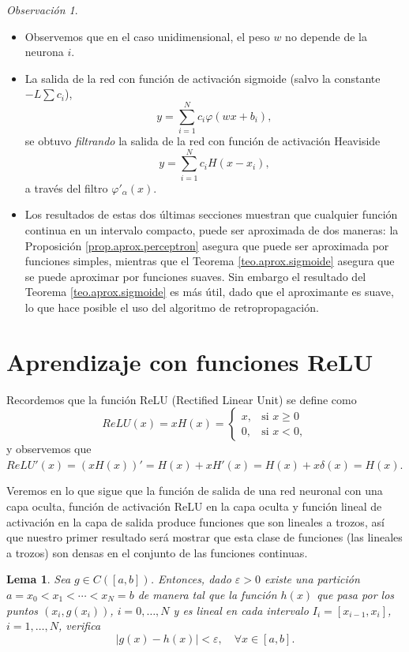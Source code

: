 \documentclass[12pt, a4paper]{amsbook}
\newcommand{\ve}{\varepsilon}
\newtheorem{lema}[teo]{Lema}
\theoremstyle{remark}
\newtheorem{obs}[teo]{Observaci\'on}
\theoremstyle{definition}
\numberwithin{section}{chapter}
\numberwithin{subsection}{section}
\numberwithin{equation}{section}
\numberwithin{figure}{chapter}
\begin{document}
\begin{obs}
\begin{itemize}
\item[(i)] Observemos que en el caso unidimensional, el peso $w$ no depende de la neurona $i$.
\item[(ii)] La salida de la red con función de activación sigmoide (salvo la constante $-L\sum c_i$),
$$
y = \sum_{i=1}^N c_i\varphi(w x + b_i),
$$
se obtuvo {\em filtrando} la salida de la red con función de activación Heaviside
$$
y = \sum_{i=1}^N c_i H(x - x_i),
$$
a través del filtro $\varphi'_\alpha(x)$.

\item[(iii)] Los resultados de estas dos últimas secciones muestran que cualquier función continua en un intervalo compacto, puede ser aproximada de dos maneras: la Proposición \ref{prop.aprox.perceptron} asegura que puede ser aproximada por funciones simples, mientras que el Teorema \ref{teo.aprox.sigmoide} asegura que se puede aproximar por funciones suaves. Sin embargo el resultado del Teorema \ref{teo.aprox.sigmoide} es más útil, dado que el aproximante es suave, lo que hace posible el uso del algoritmo de retropropagación.
\end{itemize}
\end{obs}

\section{Aprendizaje con funciones ReLU}\label{sec.c8.4}

Recordemos que la función ReLU (Rectified Linear Unit) se define como
$$
ReLU(x) = xH(x) = \begin{cases}
x, &\text{si } x\ge 0\\
0, &\text{si } x<0,
\end{cases}
$$
y observemos que $ReLU'(x) = (xH(x))' = H(x) + xH'(x) = H(x) + x\delta(x) = H(x)$.

Veremos en lo que sigue que la función de salida de una red neuronal con una capa oculta, función de activación ReLU en la capa oculta y función lineal de activación en la capa de salida produce funciones que son lineales a trozos, así que nuestro primer resultado será mostrar que esta clase de funciones (las lineales a trozos) son densas en el conjunto de las funciones continuas.

\begin{lema}\label{lema.lineal.trozos}
Sea $g\in C([a, b])$. Entonces, dado $\ve>0$ existe una partición $a=x_0<x_1<\cdots<x_N=b$ de manera tal que la función $h(x)$ que pasa por los puntos $(x_i, g(x_i))$, $i=0,\dots,N$ y es lineal en cada intervalo $I_i= [x_{i-1}, x_i]$, $i=1,\dots,N$, verifica
$$
|g(x)-h(x)|<\ve,\quad \forall x\in [a, b].
$$
\end{lema}
\end{document}

